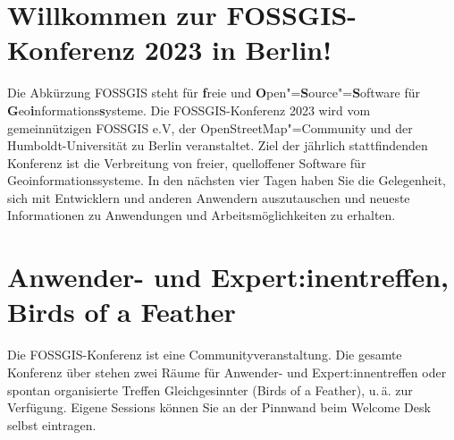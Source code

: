 \newpage
\section*{Willkommen zur FOSSGIS-Konferenz 2023 in Berlin!} \label{welcome}
Die Abkürzung { FOSSGIS} steht für {\bfseries f}reie und {\bfseries O}pen"={\bfseries S}ource"={\bfseries S}oftware für {\bfseries G}eo{\bfseries i}nformations{\bfseries s}ysteme.
Die FOSSGIS-Konferenz 2023 wird vom gemeinnützigen FOSSGIS e.V, der
OpenStreetMap"=Community und der Humboldt-Universität zu Berlin
veranstaltet.
Ziel der jährlich stattfindenden Konferenz ist die Verbreitung von freier,
quelloffener Software für Geoinformationssysteme. In den nächsten vier Tagen
haben Sie die Gelegenheit, sich mit Entwicklern und anderen Anwendern
auszutauschen und \mbox{neueste} Informationen zu Anwendungen und
Arbeitsmöglichkeiten zu erhalten.

\section*{Anwender- und Expert:inentreffen, Birds of a Feather}
Die FOSSGIS-Konferenz ist eine Communityveranstaltung.
Die gesamte Konferenz über stehen zwei Räume für Anwender- und Expert:innentreffen oder spontan organisierte
Treffen Gleichgesinnter (Birds of a Feather), u.\,ä.
zur Verfügung. Eigene Sessions können Sie an der Pinnwand beim
Welcome Desk selbst eintragen.

\newpage

\newpage

\newpage

\newpage

\newpage

\newpage

